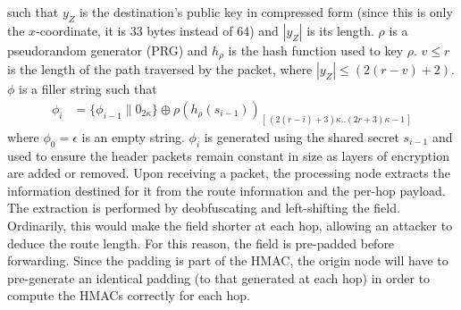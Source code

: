 
such that $y_Z$ is the destination's public key in compressed form (since this is only the $x$-coordinate, it is 33 bytes instead of 64) and $|y_Z|$ is its length. $\rho$ is a pseudorandom generator (PRG) and $h_{\rho}$ is the hash function used to key $\rho$.
$v\leq r$ is the length of the path traversed by the packet, where $|y_Z| \leq (2(r - v) + 2)$. $\phi$ is a filler string such that
\begin{align}
    \phi_i & =\{ \phi_{i-1}\|0_{2\kappa}\}\oplus \rho(h_{\rho}(s_{i-1}))_{[ \,(2(r-i)+3)\kappa..(2r+3)\kappa-1\,]}
\end{align}
where $\phi_0=\epsilon$ is an empty string. $\phi_i$ is generated using the shared secret $s_{i-1}$ and used to ensure the header packets remain constant in size as layers of encryption are added or removed. Upon receiving a packet, the processing node extracts the information destined for it from the route information and the per-hop payload. The extraction is performed by deobfuscating and left-shifting the field. Ordinarily, this would make the field shorter at each hop, allowing an attacker to deduce the route length. For this reason, the field is pre-padded before forwarding. Since the padding is part of the HMAC, the origin node will have to pre-generate an identical padding (to that generated at each hop) in order to compute the HMACs correctly for each hop.

